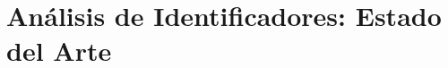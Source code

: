 \documentclass[a4paper,12pt]{report}
\begin{document}
%


%

%

\setcounter{chapter}{2}
\chapter{Análisis de Identificadores: Estado del Arte}


%

%


%
\end{document}
